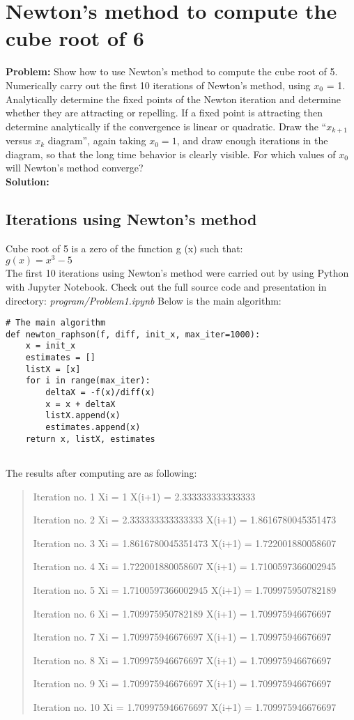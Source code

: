\newpage
\section{Newton's method to compute the cube root of 6}
\label{sec:newton_s_method_to_compute_the_cube_root_of_6}

\textbf{Problem:}
Show how to use Newton’s method to compute the cube root
of 5. Numerically carry out the first 10 iterations of Newton’s method, using $x_{0}$ = 1. 
Analytically determine the fixed points of the Newton iteration and determine whether they are attracting or repelling.
If a fixed point is attracting then determine analytically if the convergence is linear or quadratic.
Draw the “$x_{k+1}$ versus $x_{k}$ diagram”, again taking $x_{0} = 1$, and draw enough iterations in the diagram, so that the long time behavior is clearly visible. 
For which values of $x_{0}$ will Newton’s method converge?
\\
\textbf{Solution:}
\subsection{Iterations using Newton's method}
\label{10iterations}
Cube root of 5 is a zero of the function g (x) such that:\\
$g(x) = x^{3} - 5$\\

The first 10 iterations using Newton's method were carried out by using Python with Jupyter Notebook. 
Check out the full source code and presentation in directory: \textit{program/Problem1.ipynb}
Below is the main algorithm:
\begin{lstlisting}
# The main algorithm
def newton_raphson(f, diff, init_x, max_iter=1000):
    x = init_x
    estimates = []
    listX = [x]
    for i in range(max_iter):
        deltaX = -f(x)/diff(x)
        x = x + deltaX
        listX.append(x)
        estimates.append(x)
    return x, listX, estimates
    
\end{lstlisting}

The results after computing are as following:
\begin{quote}
Iteration no.  1
Xi =  1
X(i+1) =  2.333333333333333 

Iteration no.  2
Xi =  2.333333333333333
X(i+1) =  1.8616780045351473 

Iteration no.  3
Xi =  1.8616780045351473
X(i+1) =  1.722001880058607 

Iteration no.  4
Xi =  1.722001880058607
X(i+1) =  1.7100597366002945 

Iteration no.  5
Xi =  1.7100597366002945
X(i+1) =  1.709975950782189 

Iteration no.  6
Xi =  1.709975950782189
X(i+1) =  1.709975946676697 

Iteration no.  7
Xi =  1.709975946676697
X(i+1) =  1.709975946676697 

Iteration no.  8
Xi =  1.709975946676697
X(i+1) =  1.709975946676697 

Iteration no.  9
Xi =  1.709975946676697
X(i+1) =  1.709975946676697 

Iteration no.  10
Xi =  1.709975946676697
X(i+1) =  1.709975946676697 
\end{quote}

